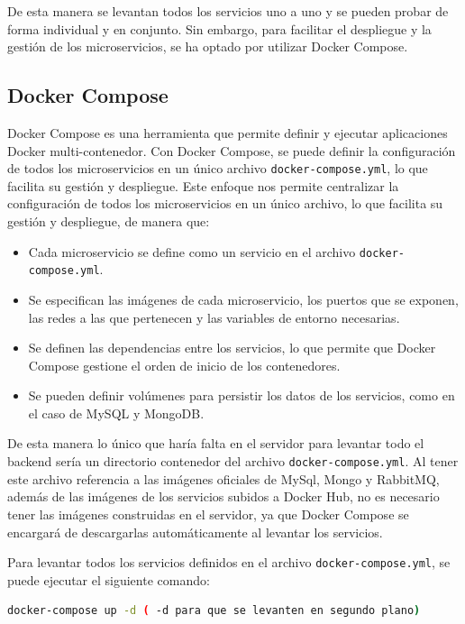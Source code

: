 De esta manera se levantan todos los servicios uno a uno y se pueden probar de forma individual y en conjunto. Sin embargo, para facilitar el despliegue y la gestión de los microservicios, se ha optado por utilizar Docker Compose.

\subsection{Docker Compose}
Docker Compose es una herramienta que permite definir y ejecutar aplicaciones Docker multi-contenedor. Con Docker Compose, se puede definir la configuración de todos los microservicios en un único archivo \texttt{docker-compose.yml}, lo que facilita su gestión y despliegue.
\newline\newline
Este enfoque nos permite centralizar la configuración de todos los microservicios en un único archivo, lo que facilita su gestión y despliegue, de manera que:
\begin{itemize}
    \item Cada microservicio se define como un servicio en el archivo \texttt{docker-compose.yml}.
    \item Se especifican las imágenes de cada microservicio, los puertos que se exponen, las redes a las que pertenecen y las variables de entorno necesarias.
    \item Se definen las dependencias entre los servicios, lo que permite que Docker Compose gestione el orden de inicio de los contenedores.
    \item Se pueden definir volúmenes para persistir los datos de los servicios, como en el caso de MySQL y MongoDB.
\end{itemize}

De esta manera lo único que haría falta en el servidor para levantar todo el backend sería un directorio contenedor del archivo \texttt{docker-compose.yml}. Al tener este archivo referencia a las imágenes oficiales de MySql, Mongo y RabbitMQ, además de las imágenes de los servicios subidos a Docker Hub, no es necesario tener las imágenes construidas en el servidor, ya que Docker Compose se encargará de descargarlas automáticamente al levantar los servicios.

Para levantar todos los servicios definidos en el archivo \texttt{docker-compose.yml}, se puede ejecutar el siguiente comando:
\begin{lstlisting}[language=bash]
    docker-compose up -d ( -d para que se levanten en segundo plano)
\end{lstlisting}

